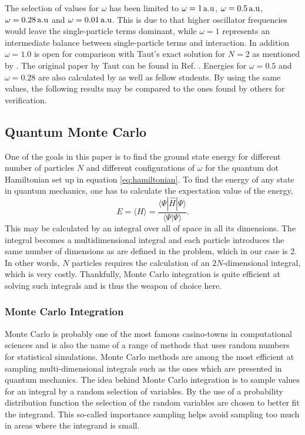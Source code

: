 \documentclass[aps,prb,twocolumn,floatfix]{revtex4}
\begin{document}
The selection of values for $\omega$ has been limited to $\omega = \unit[1]{a.u}$, $\omega = \unit[0.5]{a.u}$, $\omega = \unit[0.28]{a.u}$ and $\omega = \unit[0.01]{a.u}$. This is due to that higher oscillator frequencies would leave the single-particle terms dominant, while $\omega = 1$ represents an intermediate balance between single-particle terms and interaction. In addition $\omega  = 1.0$ is open for comparison with Taut's exact solution for $N=2$ as mentioned by \textcite{PhysRevB.84.115302}. The original paper by Taut can be found in Ref. . Energies for $\omega = 0.5$ and $\omega = 0.28$ are also calculated by \textcite{PhysRevB.84.115302} as well as fellow students. By using the same values, the following results may be compared to the ones found by others for verification.



\subsection{Quantum Monte Carlo} \label{sec:qmc}

One of the goals in this paper is to find the ground state energy for different number of particles $N$ and different configurations of $\omega$ for the quantum dot Hamiltonian set up in equation \ref{eq:hamiltonian}. To find the energy of any state in quantum mechanics, one has to calculate the expectation value of the energy,
\begin{equation}
    E = \langle H \rangle = \frac{\langle \Psi | \hat H | \Psi \rangle}{\langle \Psi | \Psi \rangle}. \label{eq:energy}
\end{equation}
This may be calculated by an integral over all of space in all its dimensions. The integral becomes a multidimensional integral and each particle introduces the same number of dimensions as are defined in the problem, which in our case is 2. In other words, $N$ particles requires the calculation of an $2N$-dimensional integral, which is very costly. Thankfully, Monte Carlo integration is quite efficient at solving such integrals and is thus the weapon of choice here.

\subsubsection{Monte Carlo Integration}

Monte Carlo is probably one of the most famous casino-towns in computational sciences and is also the name of a range of methods that uses random numbers for statistical simulations. Monte Carlo methods are among the most efficient at sampling multi-dimensional integrals such as the ones which are presented in quantum mechanics. The idea behind Monte Carlo integration is to sample values for an integral by a random selection of variables. By the use of a probability distribution function the selection of the random variables are chosen to better fit the integrand. This so-called importance sampling helps avoid sampling too much in areas where the integrand is small.
\end{document}
